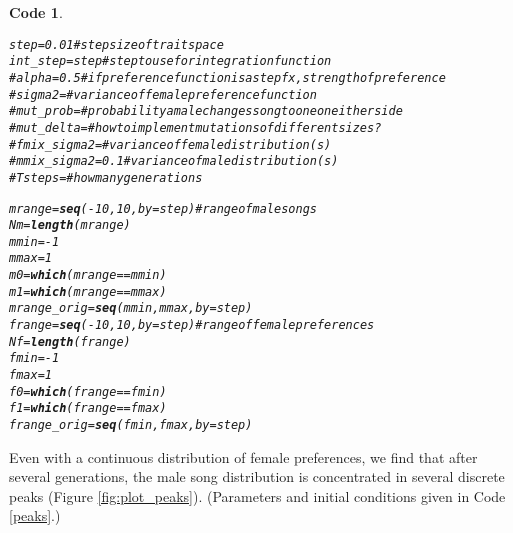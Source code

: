 \documentclass{article}\usepackage[]{graphicx}\usepackage[]{color}
\makeatletter
\newcommand{\hlnum}[1]{\textcolor[rgb]{0.686,0.059,0.569}{#1}}%
\newcommand{\hlcom}[1]{\textcolor[rgb]{0.678,0.584,0.686}{\textit{#1}}}%
\newcommand{\hlopt}[1]{\textcolor[rgb]{0,0,0}{#1}}%
\newcommand{\hlstd}[1]{\textcolor[rgb]{0.345,0.345,0.345}{#1}}%
\newcommand{\hlkwb}[1]{\textcolor[rgb]{0.69,0.353,0.396}{#1}}%
\newcommand{\hlkwc}[1]{\textcolor[rgb]{0.333,0.667,0.333}{#1}}%
\newcommand{\hlkwd}[1]{\textcolor[rgb]{0.737,0.353,0.396}{\textbf{#1}}}%
\newenvironment{kframe}{%
 \def\at@end@of@kframe{}%
 \ifinner\ifhmode%
  \def\at@end@of@kframe{\end{minipage}}%
  \begin{minipage}{\columnwidth}%
 \fi\fi%
 \def\FrameCommand##1{\hskip\@totalleftmargin \hskip-\fboxsep
 \colorbox{shadecolor}{##1}\hskip-\fboxsep
     \hskip-\linewidth \hskip-\@totalleftmargin \hskip\columnwidth}%
 \MakeFramed {\advance\hsize-\width
   \@totalleftmargin\z@ \linewidth\hsize
   \@setminipage}}%
 {\par\unskip\endMakeFramed%
 \at@end@of@kframe}
\newenvironment{knitrout}{}{} %
\newtheorem{rexample}{Code}[section]
\makeatother
\begin{document}
\begin{knitrout}\footnotesize
{}\color{fgcolor}\begin{kframe}
\begin{rexample}\label{parameters}\hfill{}\begin{alltt}
\hlstd{step} \hlkwb{=} \hlnum{0.01} \hlcom{#step size of trait space}
\hlstd{int_step} \hlkwb{=} \hlstd{step} \hlcom{#step to use for integration function}
\hlcom{# alpha = 0.5 #if preference function is a step fx, strength of preference}
\hlcom{# sigma2 = #variance of female preference function}
\hlcom{# mut_prob =  #probability a male changes song to one on either side}
\hlcom{# mut_delta = #how to implement mutations of different sizes?}
\hlcom{# fmix_sigma2 = #variance of female distribution(s)}
\hlcom{# mmix_sigma2 = 0.1 #variance of male distribution(s)}
\hlcom{# Tsteps = #how many generations}

\hlstd{mrange} \hlkwb{=} \hlkwd{seq}\hlstd{(}\hlopt{-}\hlnum{10}\hlstd{,}\hlnum{10}\hlstd{,}\hlkwc{by}\hlstd{=step)} \hlcom{#range of male songs}
\hlstd{Nm} \hlkwb{=} \hlkwd{length}\hlstd{(mrange)}
\hlstd{mmin} \hlkwb{=} \hlopt{-}\hlnum{1}
\hlstd{mmax} \hlkwb{=} \hlnum{1}
\hlstd{m0} \hlkwb{=} \hlkwd{which}\hlstd{(mrange}\hlopt{==}\hlstd{mmin)}
\hlstd{m1} \hlkwb{=} \hlkwd{which}\hlstd{(mrange}\hlopt{==}\hlstd{mmax)}
\hlstd{mrange_orig} \hlkwb{=} \hlkwd{seq}\hlstd{(mmin,mmax,}\hlkwc{by}\hlstd{=step)}
\hlstd{frange} \hlkwb{=} \hlkwd{seq}\hlstd{(}\hlopt{-}\hlnum{10}\hlstd{,}\hlnum{10}\hlstd{,}\hlkwc{by}\hlstd{=step)} \hlcom{#range of female preferences}
\hlstd{Nf} \hlkwb{=} \hlkwd{length}\hlstd{(frange)}
\hlstd{fmin} \hlkwb{=} \hlopt{-}\hlnum{1}
\hlstd{fmax} \hlkwb{=} \hlnum{1}
\hlstd{f0} \hlkwb{=} \hlkwd{which}\hlstd{(frange}\hlopt{==}\hlstd{fmin)}
\hlstd{f1} \hlkwb{=} \hlkwd{which}\hlstd{(frange}\hlopt{==}\hlstd{fmax)}
\hlstd{frange_orig} \hlkwb{=} \hlkwd{seq}\hlstd{(fmin,fmax,}\hlkwc{by}\hlstd{=step)}
\end{alltt}
\end{rexample}\end{kframe}
\end{knitrout}

Even with a continuous distribution of female preferences, we find that after several generations, the male song distribution is concentrated in several discrete peaks (Figure \ref{fig:plot_peaks}). (Parameters and initial conditions given in Code \ref{peaks}.)
\end{document}

